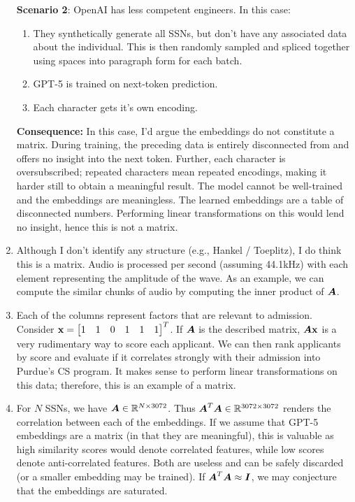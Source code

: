 \documentclass[]{exam}
\begin{document}
\begin{questions}
\begin{enumerate}[label=\arabic*.]
		\textbf{Scenario 2}: OpenAI has less competent engineers. In this case:
		\begin{enumerate}[label=\alph*.]
			\item They synthetically generate all SSNs, but don't have any associated data about the individual. This is then randomly sampled and spliced together using spaces into paragraph form for each batch.
			\item GPT-5 is trained on next-token prediction.
			\item Each character gets it's own encoding.
		\end{enumerate}
		\textbf{Consequence:} In this case, I'd argue the embeddings do not constitute a matrix. During training, the preceding data is entirely disconnected from and offers no insight into the next token. Further, each character is oversubscribed; repeated characters mean repeated encodings, making it harder still to obtain a meaningful result. The model cannot be well-trained and the embeddings are meaningless. The learned embeddings are a table of disconnected numbers. Performing linear transformations on this would lend no insight, hence this is not a matrix.
	\item Although I don't identify any structure (e.g., Hankel / Toeplitz), I do think this is a matrix. Audio is processed per second (assuming 44.1kHz) with each element representing the amplitude of the wave. As an example, we can compute the similar chunks of audio by computing the inner product of $\boldsymbol{A}$.
	\item Each of the columns represent factors that are relevant to admission. Consider $\boldsymbol{\mathrm{x}} = \begin{bmatrix} 1 & 1 & 0 & 1 & 1 & 1 \end{bmatrix}^T$. If $\boldsymbol{A}$ is the described matrix, $\boldsymbol{A} \boldsymbol{\mathrm{x}}$ is a very rudimentary way to score each applicant. We can then rank applicants by score and evaluate if it correlates strongly with their admission into Purdue's CS program. It makes sense to perform linear transformations on this data; therefore, this is an example of a matrix.
	\item For $N$ SSNs, we have $\boldsymbol{A} \in \mathbb{R}^{N \times 3072}$. Thus $\boldsymbol{A}^T \boldsymbol{A} \in \mathbb{R}^{3072 \times 3072}$ renders the correlation between each of the embeddings. If we assume that GPT-5 embeddings are a matrix (in that they are meaningful), this is valuable as high similarity scores would denote correlated features, while low scores denote anti-correlated features. Both are useless and can be safely discarded (or a smaller embedding may be trained). If $\boldsymbol{A}^T \boldsymbol{A} \approx \boldsymbol{I}$, we may conjecture that the embeddings are saturated.

\end{enumerate}
\end{questions}
\end{document}
